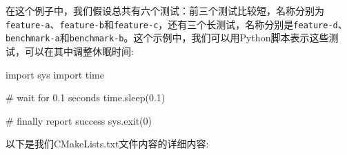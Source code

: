 
在这个例子中，我们假设总共有六个测试：前三个测试比较短，名称分别为\texttt{feature-a}、\texttt{feature-b}和\texttt{feature-c}，还有三个长测试，名称分别是\texttt{feature-d}、\texttt{benchmark-a}和\texttt{benchmark-b}。这个示例中，我们可以用Python脚本表示这些测试，可以在其中调整休眠时间:

\begin{codebox}[python]
import sys
import time

# wait for 0.1 seconds
time.sleep(0.1)

# finally report success
sys.exit(0)
\end{codebox}


以下是我们CMakeLists.txt文件内容的详细内容:

